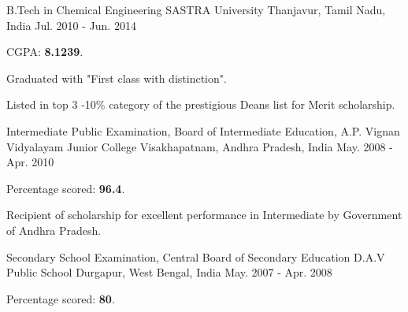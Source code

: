 

\begin{cventries}

  \cventry
    {B.Tech in Chemical Engineering} %
    {SASTRA University} %
    {Thanjavur, Tamil Nadu, India} %
    {Jul. 2010 - Jun. 2014} %
    {
      \begin{cvitems} %
        \item {CGPA: \textbf{8.1239}.}
        \item {Graduated with "First class with distinction".} 
        \item {Listed in top 3 -10\% category of the prestigious Deans list for Merit scholarship.}
      \end{cvitems}
    }


  \cventry
    {Intermediate Public Examination, Board of Intermediate Education, A.P.} %
    {Vignan Vidyalayam Junior College} %
    {Visakhapatnam, Andhra Pradesh, India} %
    {May. 2008 - Apr. 2010} %
    {
      \begin{cvitems} %
        \item {Percentage scored: \textbf{96.4}.}
        \item {Recipient of scholarship for excellent performance in Intermediate by Government of Andhra Pradesh.}
      \end{cvitems}
    }


  \cventry
    {Secondary School Examination, Central Board of Secondary Education} %
    {D.A.V Public School} %
    {Durgapur, West Bengal, India} %
    {May. 2007 - Apr. 2008} %
    {
      \begin{cvitems} %
        \item {Percentage scored: \textbf{80}.} 
      \end{cvitems}
    }

\end{cventries}
